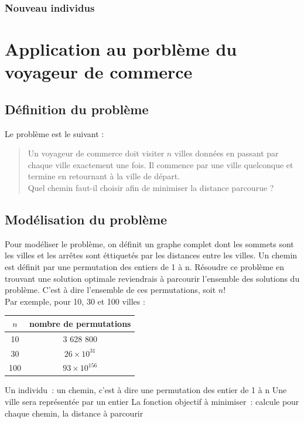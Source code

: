 \documentclass{article}
\begin{document}
		\subsubsection{Nouveau individus}

\section{Application au porblème du voyageur de commerce}
	\subsection{Définition du problème}
	Le problème est le suivant : 
	\begin{quote}
	Un voyageur de commerce doit visiter $n$ villes données en passant par chaque ville exactement une fois. Il commence par une ville quelconque et termine en retournant à la ville de départ.\\
	Quel chemin faut-il choisir afin de minimiser la distance parcourue ?
	\end{quote}
	
	\subsection{Modélisation du problème}
	
	Pour modéliser le problème, on définit un graphe complet dont les sommets sont les villes et les arrêtes sont éttiquetés par les distances entre les villes. Un chemin est définit par une permutation des entiers de 1 à n.
	Résoudre ce problème en trouvant une solution optimale reviendrais à parcourir l'ensemble des solutions du problème. C'est à dire l'ensemble de ces permutations, soit $n!$ \\
	Par exemple, pour 10, 30 et 100 villes : \\
	\begin{tabular}{cc}
	\hline
	$n$ & nombre de permutations \\
	\hline
	10 & 3 628 800 \\
	30 & $26 \times 10^{31}$ \\
	100 & $93 \times 10^{156}$ \\
	\hline
	\end{tabular}

	
	Un individu : un chemin, c'est à dire une permutation des entier de 1 à n
	Une ville sera représentée par un entier
	La fonction objectif à minimiser : calcule pour chaque chemin, la distance à parcourir
\end{document}
